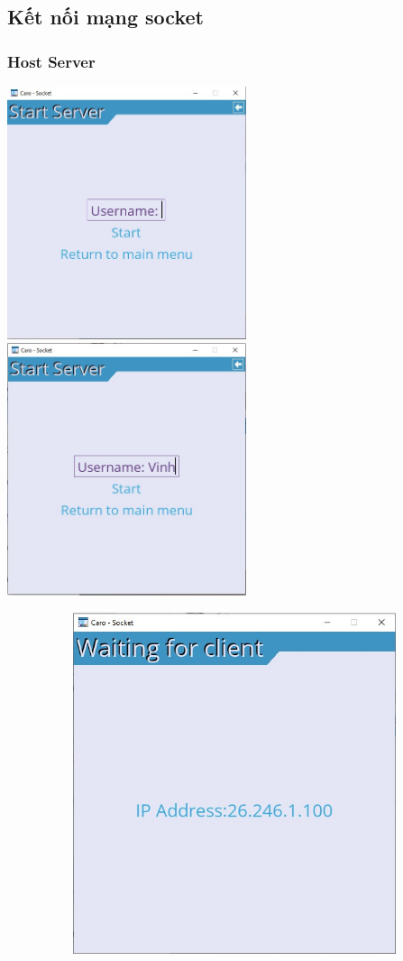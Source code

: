 \documentclass[a4paper]{article}
\begin{document}
\subsection{Kết nối mạng socket}
\subsubsection{Host Server}
\includegraphics[width=7cm]{images/app/start_server1.png}
\includegraphics[width=7cm]{images/app/start_server2.png}
\vspace{5pt}

\includegraphics[width=13.5cm, height=10cm]{images/app/waiting_for_client.png}
\end{document}
